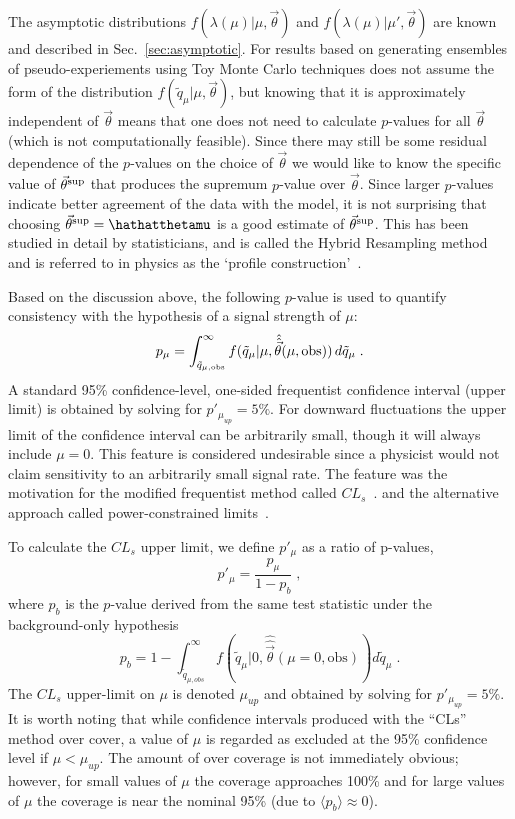 The asymptotic distributions \mbox{$f(\lambda(\mu) | \mu, \vec\theta)$} and \mbox{$f(\lambda(\mu) | \mu', \vec\theta)$} are known and described in Sec.~\ref{sec:asymptotic}.  For results based on generating ensembles of pseudo-experiements using Toy Monte Carlo techniques does not assume the form of the distribution $f(\tilde{q}_\mu | \mu, \vec\theta)$, but knowing that it is approximately independent of $\vec\theta$ means that one does not need to calculate $p$-values for all $\vec\theta$ (which is not computationally feasible).  Since there may still be some residual dependence of the $p$-values on the choice of $\vec\theta$ we would like to know the specific value of $\vec\theta^{\rm sup}$ that produces the supremum $p$-value over $\vec\theta$.  Since larger $p$-values indicate better agreement of the data with the model, it is not surprising that choosing $\vec\theta^{\rm sup}=\hathatthetamu$ is a good estimate of $\vec\theta^{\rm sup}$.  This has been studied in detail by statisticians, and is called the Hybrid Resampling method and is referred to in physics as the `profile construction'~\cite{Feldman,Cranmer,hybridResampling,Bodhi}.


Based on the discussion above, the following $p$-value is used to quantify consistency with the hypothesis of a signal strength of $\mu$:
\begin{equation}
p_{\mu}=\int_{\tilde q_{\mu,\rm obs}}^{\infty} f(\tilde q_\mu|\mu,\hat{\hat{\vec{\theta}}}(\mu,\textrm{obs})) \,d\tilde q_\mu \;.
\end{equation}
A standard 95\% confidence-level, one-sided frequentist confidence interval (upper limit) is obtained by  solving for $p'_{\mu_{up}}=5\%$.  For downward fluctuations the upper limit of the confidence interval can be arbitrarily small, though it will always include $\mu=0$.  This feature is considered undesirable since a physicist would not claim sensitivity to an arbitrarily small signal rate.  The feature was the motivation for the modified frequentist method called $CL_s$~\cite{Read2,Read1,CLsWikipedia}. and the alternative approach called power-constrained limits~\cite{2011arXiv1105.3166C}. 


To calculate the $CL_s$ upper limit, we define $p'_\mu$ as a ratio of p-values,
\begin{equation}
p'_\mu=\frac{p_\mu}{1-p_b} \; ,
\end{equation}
where  $p_b$ is the $p$-value derived from the same test statistic under the background-only hypothesis
\begin{equation}
\label{eqn:pb}
p_b=1-\int_{\tilde q_{\mu,obs}}^\infty f(\tilde q_\mu|0,\hat{\hat{\vec{\theta}}}(\mu=0,\textrm{obs}))d\tilde q_\mu \;.
\end{equation}
The $CL_s$ upper-limit on $\mu$ is denoted $\mu_{up}$ and obtained by solving for $p'_{\mu_{up}}=5\%$.  
It is worth noting that while confidence intervals produced with the ``CLs'' method over cover, a value of $\mu$ is regarded as excluded at the 95\% confidence level if $\mu<\mu_{up}$.  The amount of over coverage is not immediately obvious; however, for small values of $\mu$ the coverage approaches 100\% and for large values of $\mu$ the coverage is near the nominal 95\% (due to $\langle p_b\rangle\approx0$).


